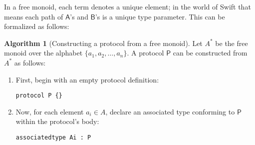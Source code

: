 \documentclass[headsepline,bibliography=totoc]{scrreport}
\newcommand{\namesym}[1]{\mathsf{#1}}
\newcommand{\proto}[1]{\bm{\mathsf{#1}}}
\theoremstyle{definition}
\theoremstyle{definition}
\theoremstyle{definition}
\newtheorem{algorithm}{Algorithm}[chapter]
\begin{document}
In a free monoid, each term denotes a unique element; in the world of Swift that means each path of $\namesym{A}$'s and $\namesym{B}$'s is a unique type parameter. This can be formalized as follows:
\begin{algorithm}[Constructing a protocol from a free monoid]\label{freemonoidproto}
Let $A^*$ be the free monoid over the alphabet $\{a_1,a_2,\ldots,a_n\}$. A protocol $\proto{P}$ can be constructed from $A^*$ as follows:
\begin{enumerate}
\item First, begin with an empty protocol definition:
\begin{Verbatim}
protocol P {}
\end{Verbatim}
\item Now, for each element $a_i\in A$, declare an associated type conforming to $\proto{P}$ within the protocol's body:
\begin{Verbatim}
associatedtype Ai : P
\end{Verbatim}
\end{enumerate}
\end{algorithm}
\end{document}
